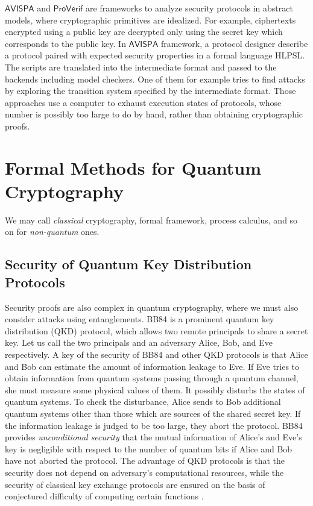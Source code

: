 $\mathsf{AVISPA}$ \cite{Armando2005} and 
$\mathsf{ProVerif}$ \cite{Blanchet2001} are frameworks to analyze
security
protocols in abstract models, where cryptographic primitives are 
idealized. For example, ciphertexts encrypted using a public key are
decrypted only using the secret key which corresponds
to the public key. In $\mathsf{AVISPA}$ framework, a protocol designer
describe a protocol paired with expected security properties
in a formal language HLPSL. The scripts are 
translated into the intermediate format and passed
to the backends including model checkers. One of them for example
tries to find attacks by
exploring the transition system specified by the intermediate format.
Those approaches use a computer to exhaust execution states of
protocols, whose number is possibly too large to do by hand,
rather than obtaining cryptographic proofs.


\section{Formal Methods for Quantum Cryptography}
We may call {\it classical} cryptography, formal framework, process
calculus, and so on for {\it non-quantum} ones.

\subsection{Security of Quantum Key Distribution Protocols}
Security proofs are also complex in quantum cryptography,
where we must also consider attacks using entanglements.
BB84 \cite{BennetBrassard1984}
is a prominent quantum key distribution (QKD)
protocol, which allows two remote principals to share a secret
key. Let us call the two principals and an adversary Alice, Bob, and Eve 
respectively. A key of the security of BB84 and other QKD protocols
\cite{LoChau1999, TamakiKoashiImoto2003} is 
that Alice and Bob can estimate the amount of information leakage to
Eve. If Eve tries to obtain
information from quantum systems passing through a quantum channel,
she must measure some physical values of them.
It possibly disturbs the states of quantum
systems. To check the disturbance, Alice sends to Bob 
additional quantum systems
other than those which are sources of the shared secret key.
If the information leakage is judged to be too large, they
abort the protocol.
BB84 provides {\it unconditional security} that
the mutual information of Alice's and Eve's key is negligible
with respect to the number of quantum bits if Alice and Bob have not
aborted the protocol. The advantage of QKD protocols is that
the security does not depend on adversary's computational resources, 
while the security of classical key exchange protocols
are ensured on the basis of
conjectured difficulty of computing certain functions
\cite{DiffieHellman1976}.

